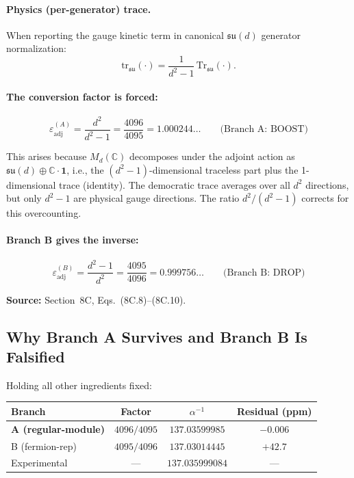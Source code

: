 \documentclass[12pt,a4paper]{article}
\begin{document}
\paragraph{Physics (per-generator) trace.}
When reporting the gauge kinetic term in canonical $\mathfrak{su}(d)$ generator
normalization:
\begin{equation}
\mathrm{tr}_{\mathfrak{su}}(\cdot) = \frac{1}{d^2 - 1}\,\mathrm{Tr}_{\mathfrak{su}}(\cdot).
\end{equation}

\paragraph{The conversion factor is forced:}
\begin{equation}
\boxed{\varepsilon_{\mathrm{adj}}^{(A)} = \frac{d^2}{d^2 - 1} = \frac{4096}{4095}
= 1.000244\ldots \qquad \text{(Branch A: BOOST)}}
\end{equation}

This arises because $M_d(\mathbb{C})$ decomposes under the adjoint action as
$\mathfrak{su}(d) \oplus \mathbb{C}\cdot\mathbf{1}$, i.e., the $(d^2-1)$-dimensional
traceless part plus the 1-dimensional trace (identity). The democratic trace
averages over all $d^2$ directions, but only $d^2 - 1$ are physical gauge
directions. The ratio $d^2/(d^2-1)$ corrects for this overcounting.

\paragraph{Branch B gives the inverse:}
\begin{equation}
\varepsilon_{\mathrm{adj}}^{(B)} = \frac{d^2 - 1}{d^2} = \frac{4095}{4096}
= 0.999756\ldots \qquad \text{(Branch B: DROP)}
\end{equation}

\textbf{Source:} Section~8C, Eqs.~(8C.8)--(8C.10).

\subsection{Why Branch A Survives and Branch B Is Falsified}

Holding all other ingredients fixed:
\begin{center}
\renewcommand{\arraystretch}{1.3}
\begin{tabular}{lccc}
\toprule
Branch & Factor & $\alpha^{-1}$ & Residual (ppm) \\
\midrule
\textbf{A (regular-module)} & $4096/4095$ & $137.03599985$ & $-0.006$ \\
B (fermion-rep) & $4095/4096$ & $137.03014445$ & $+42.7$ \\
\midrule
Experimental & --- & $137.035999084$ & --- \\
\bottomrule
\end{tabular}
\end{center}
\end{document}
